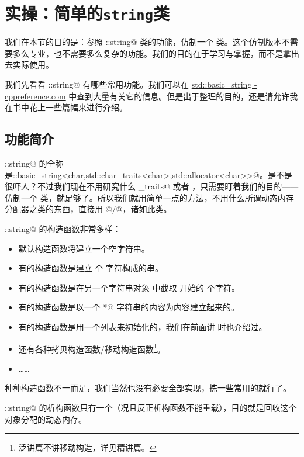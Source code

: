 \section{实操：简单的\texttt{string}类}
我们在本节的目的是：参照 \lstinline@std::string@ 类的功能，仿制一个 \lstinline@string@ 类。这个仿制版本不需要多么专业，也不需要多么复杂的功能。我们的目的在于学习与掌握，而不是拿出去实际使用。\par
我们先看看 \lstinline@std::string@ 有哪些常用功能。我们可以在 \href{https://en.cppreference.com/w/cpp/string/basic\_string}{std::basic\_string - cppreference.com} 中查到大量有关它的信息。但是出于整理的目的，还是请允许我在书中花上一些篇幅来进行介绍。\par
\subsection*{功能简介}
\lstinline@std::string@ 的全称是\newline\lstinline@std::basic_string<char,std::char_traits<char>,std::allocator<char>>@。是不是很吓人？不过我们现在不用研究什么 \lstinline@char_traits@ 或者 \lstinline@allocator@，只需要盯着我们的目的——仿制一个 \lstinline@string@ 类，就足够了。所以我们就用简单一点的方法，不用什么所谓动态内存分配器之类的东西，直接用 \lstinline@new[]@/\lstinline@delete[]@，诸如此类。\par
\lstinline@std::string@ 的构造函数非常多样：
\begin{itemize}
    \item 默认构造函数将建立一个空字符串。
    \item 有的构造函数是建立 \lstinline@count@ 个 \lstinline@ch@ 字符构成的串。
    \item 有的构造函数是在另一个字符串对象 \lstinline@other@ 中截取 \lstinline@pos@ 开始的 \lstinline@count@ 个字符。
    \item 有的构造函数是以一个 \lstinline@char*@ 字符串的内容为内容建立起来的。
    \item 有的构造函数是用一个列表来初始化的，我们在前面讲 \lstinline@valarri@ 时也介绍过。
    \item 还有各种拷贝构造函数/移动构造函数\footnote{泛讲篇不讲移动构造，详见精讲篇。}。
    \item ……
\end{itemize}
种种构造函数不一而足，我们当然也没有必要全部实现，拣一些常用的就行了。\par
\lstinline@std::string@ 的析构函数只有一个（况且反正析构函数不能重载），目的就是回收这个对象分配的动态内存。\par
